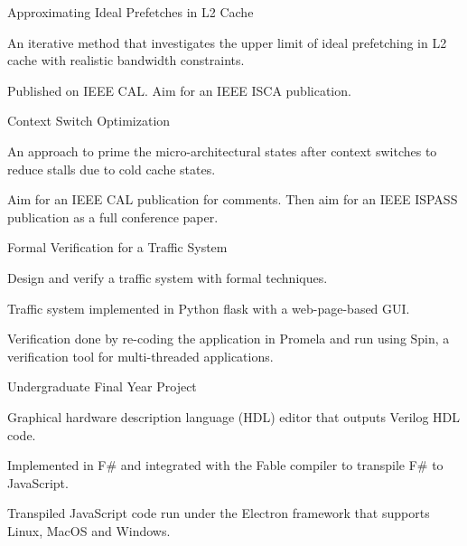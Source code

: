 
\begin{cventries}

    \cventry
    {}
    {Approximating Ideal Prefetches in L2 Cache}
    {}
    {}
    {
        \begin{cvitems}
            \item An iterative method that investigates the upper limit of ideal prefetching in L2 cache with realistic bandwidth constraints.
            \item Published on IEEE CAL. Aim for an IEEE ISCA publication.
        \end{cvitems}
    }

    \cventry
    {}
    {Context Switch Optimization}
    {}
    {}
    {
        \begin{cvitems}
            \item An approach to prime the micro-architectural states after context switches to reduce stalls due to cold cache states.            
            \item Aim for an IEEE CAL publication for comments. Then aim for an IEEE ISPASS publication as a full conference paper.
        \end{cvitems}
    }
    
    \cventry
    {}
    {Formal Verification for a Traffic System}
    {}
    {}
    {
        \begin{cvitems}
            \item Design and verify a traffic system with formal techniques.
            \item Traffic system implemented in Python flask with a web-page-based GUI.
            \item Verification done by re-coding the application in Promela and run using Spin, a verification tool for multi-threaded applications.
        \end{cvitems}
    }
    
    \cventry
    {} %
    {Undergraduate Final Year Project} %
    {} %
    {} %
    {
      \begin{cvitems} %
        \item {Graphical hardware description language (HDL) editor that outputs Verilog HDL code.}
        \item {Implemented in F\# and integrated with the Fable compiler to transpile F\# to JavaScript.}
        \item {Transpiled JavaScript code run under the Electron framework that supports Linux, MacOS and Windows.}
      \end{cvitems}
    }
    

\end{cventries}
